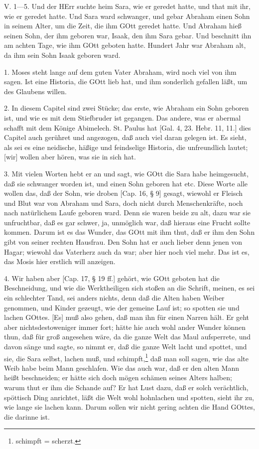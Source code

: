 \begin{schriftzitat}
V. 1—5. Und der HErr suchte heim Sara, wie er geredet hatte, und that mit ihr, wie er geredet hatte. Und Sara ward schwanger, und gebar Abraham einen Sohn in seinem Alter, um die Zeit, die ihm GOtt geredet hatte. Und Abraham hieß seinen Sohn, der ihm geboren war, Isaak, den ihm Sara gebar. Und beschnitt ihn am achten Tage, wie ihm GOtt geboten hatte. Hundert Jahr war Abraham alt, da ihm sein Sohn Isaak geboren ward.
\end{schriftzitat}

1. Moses steht lange auf dem guten Vater Abraham, wird noch viel von ihm sagen. Ist eine Historia, die GOtt lieb hat, und ihm sonderlich gefallen läßt, um des Glaubens willen.

2. In diesem Capitel sind zwei Stücke; das erste, wie Abraham ein Sohn geboren ist, und wie es mit dem Stiefbruder ist gegangen. Das andere, was er abermal schafft mit dem Könige Abimelech. St. Paulus hat [Gal. 4, 23. Hebr. 11, 11.] dies Capitel auch gerühret und angezogen, daß auch viel daran gelegen ist. Es sieht, als sei es eine neidische, häßige und feindselige Historia, die unfreundlich lautet; [wir] wollen aber hören, was sie in sich hat.

3. Mit vielen Worten hebt er an und sagt, wie GOtt die Sara habe heimgesucht, daß sie schwanger worden ist, und einen Sohn geboren hat etc. Diese Worte alle wollen das, daß der Sohn, wie droben [Cap. 16, § 9] gesagt, wiewohl er Fleisch und Blut war von Abraham und Sara, doch nicht durch Menschenkräfte, noch
nach natürlichem Laufe geboren ward. Denn sie waren beide zu alt, dazu war sie unfruchtbar, daß es gar schwer, ja, unmöglich war, daß hieraus eine Frucht sollte kommen. Darum ist es das Wunder, das GOtt mit ihm thut, daß er ihm den Sohn gibt von seiner rechten Hausfrau. Den Sohn hat er auch lieber denn jenen von Hagar; wiewohl das Vaterherz auch da war; aber hier noch viel mehr. Das ist es, das Mosis hier erstlich will anzeigen.

4. Wir haben aber [Cap. 17, § 19 ff.] gehört, wie GOtt geboten hat die Beschneidung, und wie die Werktheiligen sich stoßen an die Schrift, meinen, es sei ein schlechter Tand, sei anders nichts, denn daß die Alten haben Weiber genommen, und Kinder gezeugt, wie der gemeine Lauf ist; so spotten sie und lachen GOttes. [Es] muß also gehen, daß man ihn für einen Narren hält. Er geht aber nichtsdestoweniger immer fort; hätte hie auch wohl ander Wunder können thun, daß für groß angesehen wäre, da die ganze Welt das Maul aufsperrete, und davon sänge und sagte, so nimmt er, daß die ganze Welt lacht und spottet, und sie, die Sara selbst, lachen muß, und schimpft,\footnote{schimpft = scherzt.} daß man soll sagen, wie das alte Weib habe beim Mann geschlafen. Wie das auch war, daß er den alten Mann heißt beschneiden; er hätte sich doch mögen schämen seines Alters halben; warum thut er ihm die Schande auf? Er hat Lust dazu, daß er solch verächtlich, spöttisch Ding anrichtet, läßt die Welt wohl hohnlachen und spotten, sieht ihr zu, wie lange sie lachen kann. Darum sollen wir nicht gering achten die Hand GOttes, die darinne ist.

